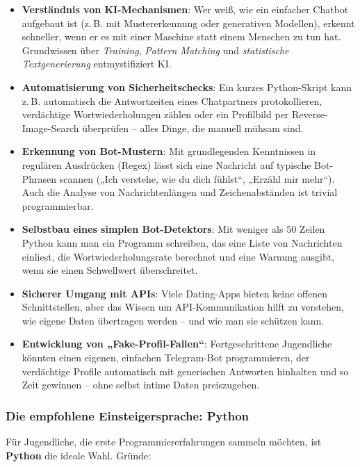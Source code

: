 \documentclass[12pt,a4paper,oneside]{scrartcl}
\begin{document}
	\begin{itemize}
		\item \textbf{Verständnis von KI-Mechanismen}: Wer weiß, wie ein einfacher Chatbot aufgebaut ist (z.\,B. mit Mustererkennung oder generativen Modellen), erkennt schneller, wenn er es mit einer Maschine statt einem Menschen zu tun hat. Grundwissen über \textit{Training}, \textit{Pattern Matching} und \textit{statistische Textgenerierung} entmystifiziert KI.
		\item \textbf{Automatisierung von Sicherheitschecks}: Ein kurzes Python-Skript kann z.\,B. automatisch die Antwortzeiten eines Chatpartners protokollieren, verdächtige Wortwiederholungen zählen oder ein Profilbild per Reverse-Image-Search überprüfen – alles Dinge, die manuell mühsam sind.
		\item \textbf{Erkennung von Bot-Mustern}: Mit grundlegenden Kenntnissen in regulären Ausdrücken (Regex) lässt sich eine Nachricht auf typische Bot-Phrasen scannen („Ich verstehe, wie du dich fühlst“, „Erzähl mir mehr“). Auch die Analyse von Nachrichtenlängen und Zeichenabständen ist trivial programmierbar.
		\item \textbf{Selbstbau eines simplen Bot-Detektors}: Mit weniger als 50 Zeilen Python kann man ein Programm schreiben, das eine Liste von Nachrichten einliest, die Wortwiederholungsrate berechnet und eine Warnung ausgibt, wenn sie einen Schwellwert überschreitet.
		\item \textbf{Sicherer Umgang mit APIs}: Viele Dating-Apps bieten keine offenen Schnittstellen, aber das Wissen um API-Kommunikation hilft zu verstehen, wie eigene Daten übertragen werden – und wie man sie schützen kann.
		\item \textbf{Entwicklung von „Fake-Profil-Fallen“}: Fortgeschrittene Jugendliche könnten einen eigenen, einfachen Telegram-Bot programmieren, der verdächtige Profile automatisch mit generischen Antworten hinhalten und so Zeit gewinnen – ohne selbst intime Daten preiszugeben.
	\end{itemize}
	
	\subsubsection{Die empfohlene Einsteigersprache: Python}
	
	Für Jugendliche, die erste Programmiererfahrungen sammeln möchten, ist \textbf{Python} die ideale Wahl. Gründe:
	
\end{document}
